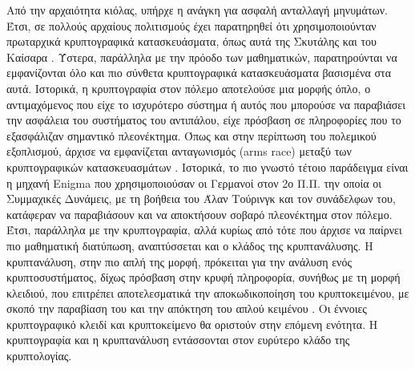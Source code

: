 Από την αρχαιότητα κιόλας, υπήρχε η ανάγκη για ασφαλή ανταλλαγή μηνυμάτων. Έτσι, σε πολλούς αρχαίους πολιτισμούς έχει παρατηρηθεί ότι χρησιμοποιούνταν πρωταρχικά κρυπτογραφικά κατασκευάσματα, όπως αυτά της Σκυτάλης \cite{doi:10.1080/0161-119891886902} και του Καίσαρα \cite{9452465}. Ύστερα, παράλληλα με την πρόοδο των μαθηματικών, παρατηρούνται να εμφανίζονται όλο και πιο σύνθετα κρυπτογραφικά κατασκευάσματα βασισμένα στα αυτά. Ιστορικά, η κρυπτογραφία στον πόλεμο αποτελούσε μια μορφής όπλο, ο αντιμαχόμενος που είχε το ισχυρότερο σύστημα ή αυτός που μπορούσε να παραβιάσει την ασφάλεια του συστήματος του αντιπάλου, είχε πρόσβαση σε πληροφορίες που το εξασφάλιζαν σημαντικό πλεονέκτημα. Όπως και στην περίπτωση του πολεμικού εξοπλισμού, άρχισε να εμφανίζεται ανταγωνισμός (arms race) μεταξύ των κρυπτογραφικών κατασκευασμάτων \cite{osti_1671059}. Ιστορικά, το πιο γνωστό τέτοιο παράδειγμα είναι η μηχανή Enigma που χρησιμοποιούσαν οι Γερμανοί στον 2ο Π.Π. την οποία οι Συμμαχικές Δυνάμεις, με τη βοήθεια του Άλαν Τούρινγκ και τον συνάδελφων του, κατάφεραν να παραβιάσουν και να αποκτήσουν σοβαρό πλεονέκτημα στον πόλεμο. Έτσι, παράλληλα με την κρυπτογραφία, αλλά κυρίως από τότε που άρχισε να παίρνει πιο μαθηματική διατύπωση, αναπτύσσεται και ο κλάδος της κρυπτανάλυσης. Η κρυπτανάλυση, στην πιο απλή της μορφή, πρόκειται για την ανάλυση ενός κρυπτοσυστήματος, δίχως πρόσβαση στην κρυφή πληροφορία, συνήθως με τη μορφή κλειδιού, που επιτρέπει αποτελεσματικά την αποκωδικοποίηση του κρυπτοκειμένου, με σκοπό την παραβίαση του και την απόκτηση του απλού κειμένου \cite{Bauer2011}. Οι έννοιες κρυπτογραφικό κλειδί και κρυπτοκείμενο θα οριστούν στην επόμενη ενότητα. Η κρυπτογραφία και η κρυπτανάλυση εντάσσονται στον ευρύτερο κλάδο της κρυπτολογίας.


